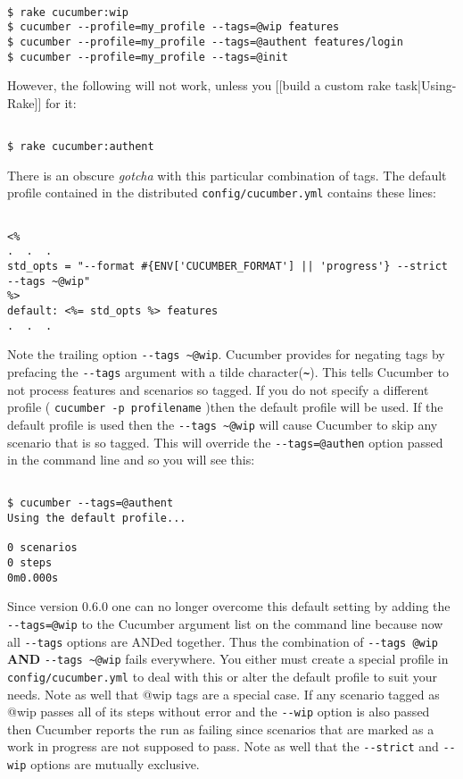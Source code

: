 \begin{verbatim}

$ rake cucumber:wip
$ cucumber --profile=my_profile --tags=@wip features
$ cucumber --profile=my_profile --tags=@authent features/login
$ cucumber --profile=my_profile --tags=@init 

\end{verbatim}
However, the following will not work, unless you [[build a custom rake task|Using-Rake]] for it:

\begin{verbatim}

$ rake cucumber:authent

\end{verbatim}
There is an obscure \emph{gotcha} with this particular combination of tags.  The default profile contained in the distributed \verb+config/cucumber.yml+ contains these lines:

\begin{verbatim}

<%
.  .  .
std_opts = "--format #{ENV['CUCUMBER_FORMAT'] || 'progress'} --strict --tags ~@wip"
%>
default: <%= std_opts %> features
.  .  .

\end{verbatim}
Note the trailing option \verb+--tags ~@wip+.  Cucumber provides for negating tags by prefacing the \verb+--tags+ argument with a tilde character(\textbf{\verb+~+}).  This tells Cucumber to not process features and scenarios so tagged. If you do not specify a different profile ( \verb+cucumber -p profilename+ )then the default profile will be used.  If the default profile is used then the \verb+--tags ~@wip+ will cause Cucumber to skip any scenario that is so tagged.  This will override the \verb+--tags=@authen+ option passed in the command line and so you will see this:

\begin{verbatim}

$ cucumber --tags=@authent
Using the default profile...

0 scenarios
0 steps
0m0.000s

\end{verbatim}
Since version 0.6.0 one can no longer overcome this default setting by adding the \verb+--tags=@wip+ to the Cucumber argument list on the command line because now all \verb+--tags+ options are ANDed together.  Thus the combination of \verb+--tags @wip+ \textbf{AND} \verb+--tags ~@wip+ fails everywhere.  You either must create a special profile in \verb+config/cucumber.yml+ to deal with this or alter the default profile to suit your needs.  Note as well that @wip tags are a special case. If any scenario tagged as @wip passes all of its steps without error and the \verb+--wip+ option is also passed then Cucumber reports the run as failing since scenarios that are marked as a work in progress are not supposed to pass.  Note as well that the \verb+--strict+ and \verb+--wip+ options are mutually exclusive.

